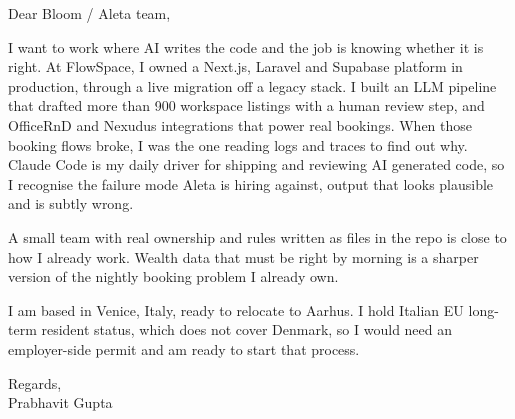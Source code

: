 \documentclass[a4paper,11pt]{article}
\begin{document}
Dear Bloom / Aleta team,

I want to work where AI writes the code and the job is knowing whether it is right. At FlowSpace, I owned a Next.js, Laravel and Supabase platform in production, through a live migration off a legacy stack. I built an LLM pipeline that drafted more than 900 workspace listings with a human review step, and OfficeRnD and Nexudus integrations that power real bookings. When those booking flows broke, I was the one reading logs and traces to find out why. Claude Code is my daily driver for shipping and reviewing AI generated code, so I recognise the failure mode Aleta is hiring against, output that looks plausible and is subtly wrong.

A small team with real ownership and rules written as files in the repo is close to how I already work. Wealth data that must be right by morning is a sharper version of the nightly booking problem I already own.

I am based in Venice, Italy, ready to relocate to Aarhus. I hold Italian EU long-term resident status, which does not cover Denmark, so I would need an employer-side permit and am ready to start that process.

Regards,\\
Prabhavit Gupta
\end{document}
